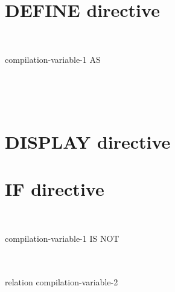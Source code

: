 \section{DEFINE directive}

\begin{1=}
  \directiveindicator \\
  \miscext{\textdollar}
\end{1=}
compilation-variable-1 AS
\begin{1=}
  \begin{1=}
      \literal \\
  \end{1=}
  \begin{0-1}
  \end{0-1} \\
\end{1=}

\section{DISPLAY directive}


\section{IF directive}

\begin{1=}
  \directiveindicator \\
  \miscext{\textdollar}
\end{1=}
 compilation-variable-1 IS NOT
\begin{1=}
   \\
   \\
  relation compilation-variable-2
\end{1=}

\sourcetext



